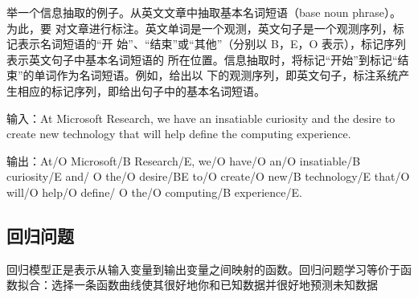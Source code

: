 举一个信息抽取的例子。从英文文章中抽取基本名词短语（base noun phrase）。为此，要
对文章进行标注。英文单词是一个观测，英文句子是一个观测序列，标记表示名词短语的“开
始”、“结束”或“其他”（分别以 B，E，O 表示），标记序列表示英文句子中基本名词短语的
所在位置。信息抽取时，将标记“开始”到标记“结束”的单词作为名词短语。例如，给出以
下的观测序列，即英文句子，标注系统产生相应的标记序列，即给出句子中的基本名词短语。

输入：At Microsoft Research, we have an insatiable curiosity and the desire to create
new technology that will help define the computing experience.

输出：At/O Microsoft/B Research/E, we/O have/O an/O insatiable/B curiosity/E and/
O the/O desire/BE to/O create/O new/B technology/E that/O will/O help/O define/
O the/O computing/B experience/E.
\subsection{回归问题}
回归模型正是表示从输入变量到输出变量之间映射的函数。回归问题学习等价于函数拟合：选择一条函数曲线使其很好地你和已知数据并很好地预测未知数据
